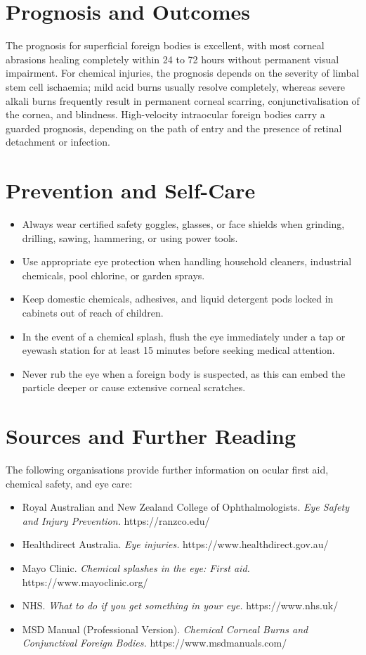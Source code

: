 \section*{Prognosis and Outcomes}
The prognosis for superficial foreign bodies is excellent, with most corneal abrasions healing completely within 24 to 72 hours without permanent visual impairment. For chemical injuries, the prognosis depends on the severity of limbal stem cell ischaemia; mild acid burns usually resolve completely, whereas severe alkali burns frequently result in permanent corneal scarring, conjunctivalisation of the cornea, and blindness. High-velocity intraocular foreign bodies carry a guarded prognosis, depending on the path of entry and the presence of retinal detachment or infection.

\section*{Prevention and Self-Care}
\begin{itemize}
    \item Always wear certified safety goggles, glasses, or face shields when grinding, drilling, sawing, hammering, or using power tools.
    \item Use appropriate eye protection when handling household cleaners, industrial chemicals, pool chlorine, or garden sprays.
    \item Keep domestic chemicals, adhesives, and liquid detergent pods locked in cabinets out of reach of children.
    \item In the event of a chemical splash, flush the eye immediately under a tap or eyewash station for at least 15 minutes before seeking medical attention.
    \item Never rub the eye when a foreign body is suspected, as this can embed the particle deeper or cause extensive corneal scratches.
\end{itemize}

\section*{Sources and Further Reading}
The following organisations provide further information on ocular first aid, chemical safety, and eye care:
\begin{itemize}
    \item Royal Australian and New Zealand College of Ophthalmologists. \textit{Eye Safety and Injury Prevention.} https://ranzco.edu/
    \item Healthdirect Australia. \textit{Eye injuries.} https://www.healthdirect.gov.au/
    \item Mayo Clinic. \textit{Chemical splashes in the eye: First aid.} https://www.mayoclinic.org/
    \item NHS. \textit{What to do if you get something in your eye.} https://www.nhs.uk/
    \item MSD Manual (Professional Version). \textit{Chemical Corneal Burns and Conjunctival Foreign Bodies.} https://www.msdmanuals.com/
\end{itemize}
